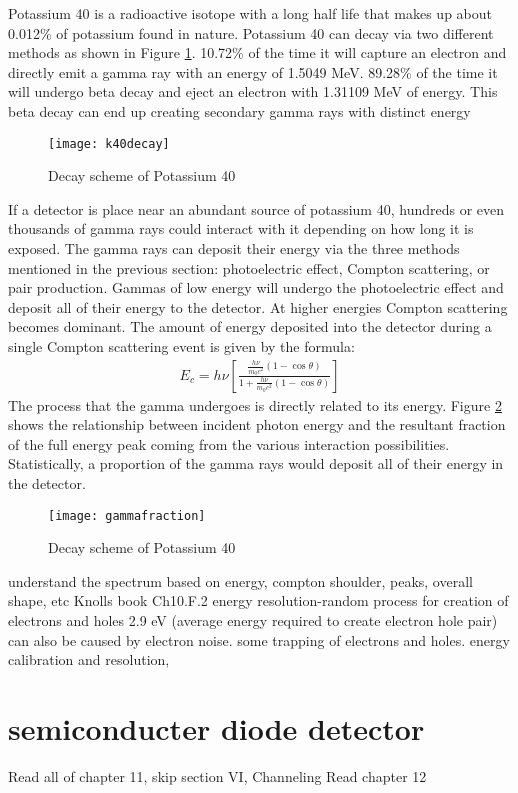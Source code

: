Potassium 40 is a radioactive isotope with a long half life that makes up about 0.012\% of potassium found in nature.
Potassium 40 can decay via two different methods as shown in Figure \ref{fig:k40decay}.
10.72\% of the time it will capture an electron and directly emit a gamma ray with an energy of 1.5049 MeV.
89.28\% of the time it will undergo beta decay and eject an electron with 1.31109 MeV of energy.
This beta decay can end up creating secondary gamma rays with distinct energy 
\begin{figure}[htpb]
\centering
\texttt{[image: k40decay]}
\caption{Decay scheme of Potassium 40}
\label{fig:k40decay}
\end{figure}
If a detector is place near an abundant source of potassium 40, hundreds or even thousands of gamma rays could interact with it depending on how long it is exposed.
The gamma rays can deposit their energy via the three methods mentioned in the previous section: photoelectric effect, Compton scattering, or pair production.
Gammas of low energy will undergo the photoelectric effect and deposit all of their energy to the detector.
At higher energies Compton scattering becomes dominant.
The amount of energy deposited into the detector during a single Compton scattering event is given by the formula:
\begin{align}
  E_c=h\nu \left[ \frac{ \frac{h\nu}{m_0c^2}(1-\cos \theta ) }{1+\frac{h\nu}{m_0c^2}(1-\cos \theta )} \right]
\end{align}
The process that the gamma undergoes is directly related to its energy.
Figure \ref{fig:gammafraction} shows the relationship between incident photon energy and the resultant fraction of the full energy peak coming from the various interaction possibilities.
Statistically, a proportion of the gamma rays would deposit all of their energy in the detector.


\begin{figure}[htpb]
\centering
\texttt{[image: gammafraction]}
  \caption{Decay scheme of Potassium 40 \cite{Roth1984SegmentationAP}}
\label{fig:gammafraction}
\end{figure}
understand the spectrum based on energy, compton shoulder, peaks, overall shape, etc Knolls book Ch10.F.2
energy resolution-random process for creation of electrons and holes 2.9 eV (average energy required to create electron hole pair) can also be caused by electron noise. some trapping of electrons and holes.
energy calibration and resolution,

\section{semiconducter diode detector} 
Read all of chapter 11, skip section VI, Channeling
Read chapter 12
